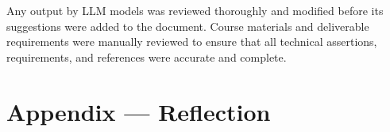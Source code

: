 \documentclass[12pt, titlepage]{article}
\begin{document}
Any output by LLM models was reviewed thoroughly and modified before its suggestions were added to the document. Course materials and deliverable requirements were manually reviewed to ensure that all technical assertions, requirements, and references were accurate and complete.

\newpage{}

\section{Appendix --- Reflection} \label{SecReflection}


\end{document}
